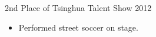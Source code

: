 \documentclass[10pt]{res} %
\begin{document}
\begin{resume}
\vspace{-5pt} %

\begin{center}
2nd Place of Tsinghua Talent Show \hfill 2012\\
\begin{itemize}
\item Performed street soccer on stage.
\end{itemize}
\end{center}

\fi

\end{resume} 
\end{document}
